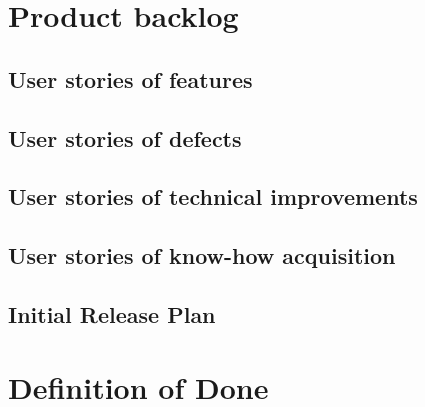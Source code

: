 \documentclass{article}
\begin{document}
\section{Product backlog}
\subsection{User stories of features}


\subsection{User stories of defects}
\subsection{User stories of technical improvements}

\subsection{User stories of know-how acquisition}

\subsection{Initial Release Plan}



\section{Definition of Done}

\printglossaries

\end{document}
